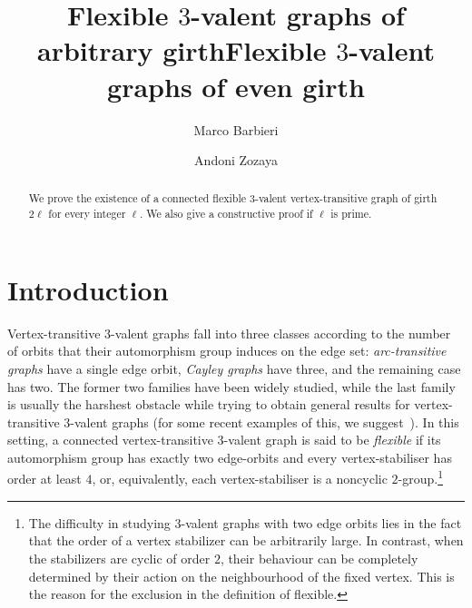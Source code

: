 \documentclass[a4paper]{amsart}
\title{Flexible $3$-valent graphs of arbitrary girth}
\author[M.~Barbieri]{Marco Barbieri}
\author[A.~Zozaya]{Andoni Zozaya}
\title{Flexible $3$-valent graphs of even girth}
\newcommand{\0}{\mathbf{0}}
\theoremstyle{definition}
\begin{document}
	
	
    \begin{abstract}
        We prove the existence of a connected flexible $3$-valent vertex-transitive graph of girth $2\ell$ for every integer $\ell$. We also give a constructive proof if $\ell$ is prime.
    \end{abstract}
	
    \maketitle

\section{Introduction}\label{sec:intro}

Vertex-transitive $3$-valent graphs fall into three classes according to the number of orbits that their automorphism group induces on the edge set: \emph{arc-transitive graphs} have a single edge orbit, \emph{Cayley graphs} have three, and the remaining case has two. The former two families have been widely studied, while the last family is usually the harshest obstacle while trying to obtain general results for vertex-transitive $3$-valent graphs (for some recent examples of this, we suggest~\cite{BarbieriGrazianSpiga2025,MaSc,   PS21, PSV15, PTV24, Spiga2014}). In this setting, a connected vertex-transitive $3$-valent graph is said to be \emph{flexible} if its automorphism group has exactly two edge-orbits and every vertex-stabiliser has order at least $4$, or, equivalently, each vertex-stabiliser is a noncyclic $2$-group.\footnote{The difficulty in studying \(3\)-valent graphs with two edge orbits lies in the fact that the order of a vertex stabilizer can be arbitrarily large. In contrast, when the stabilizers are cyclic of order \(2\), their behaviour can be completely determined by their action on the neighbourhood of the fixed vertex. This is the reason for the exclusion in the definition of flexible.}
\end{document}
